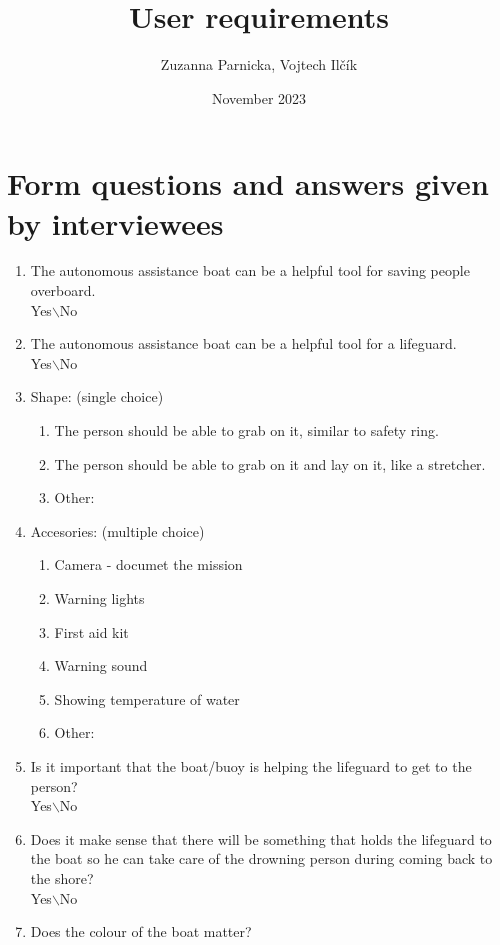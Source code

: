 \documentclass{article}[10pt]
\title{User requirements}
\author{Zuzanna Parnicka, Vojtech Il\v{c}\'{i}k}
\date{November 2023}
\begin{document}
\maketitle

\section*{Form questions and answers given by interviewees}
\begin{enumerate}
    
   
    \item The autonomous assistance boat can be a helpful tool for saving people overboard.\\
            Yes$\backslash$No
    \item The autonomous assistance boat can be a helpful tool for a lifeguard.\\
            Yes$\backslash$No
    \item Shape: (single choice)
    \begin{enumerate}
        \item  The person should be able to grab on it, similar to safety ring.
        \item  The person should be able to grab on it and lay on it, like a stretcher.
        \item  Other:
    \end{enumerate}
    \item Accesories: (multiple choice)
    \begin{enumerate}
        \item Camera - documet the mission
        \item Warning lights
        \item First aid kit
        \item Warning sound
        \item Showing temperature of water
        \item Other:
    \end{enumerate}
    \item Is it important that the boat/buoy is helping the lifeguard to get to the person?\\
            Yes$\backslash$No
    \item Does it make sense that there will be something that holds the lifeguard to the boat so he can take care of the drowning person during coming back to the shore?\\
            Yes$\backslash$No
    \item Does the colour of the boat matter?\\

\end{enumerate}
\end{document}
